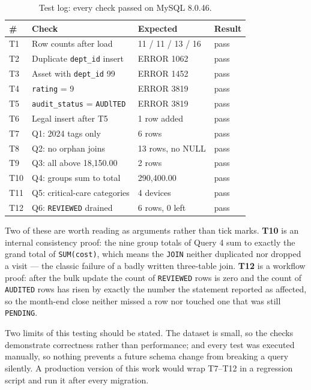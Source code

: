 \documentclass[conference]{IEEEtran}
\begin{document}
\begin{table}[!t]
\caption{Test log: every check passed on MySQL 8.0.46.}
\label{tab:tests}
\footnotesize
\begin{tabular}{p{0.3cm}p{2.6cm}p{2.3cm}p{0.9cm}}
\toprule
\textbf{\#} & \textbf{Check} & \textbf{Expected} & \textbf{Result} \\
\midrule
T1 & Row counts after load & 11 / 11 / 13 / 16 & pass \\
T2 & Duplicate \texttt{dept\_id} insert & ERROR 1062 & pass \\
T3 & Asset with \texttt{dept\_id} 99 & ERROR 1452 & pass \\
T4 & \texttt{rating} = 9 & ERROR 3819 & pass \\
T5 & \texttt{audit\_status} = \texttt{AUDlTED} & ERROR 3819 & pass \\
T6 & Legal insert after T5 & 1 row added & pass \\
T7 & Q1: 2024 tags only & 6 rows & pass \\
T8 & Q2: no orphan joins & 13 rows, no NULL & pass \\
T9 & Q3: all above 18,150.00 & 2 rows & pass \\
T10 & Q4: groups sum to total & 290,400.00 & pass \\
T11 & Q5: critical-care categories & 4 devices & pass \\
T12 & Q6: \texttt{REVIEWED} drained & 6 rows, 0 left & pass \\
\bottomrule
\end{tabular}
\end{table}

Two of these are worth reading as arguments rather than tick marks.
\textbf{T10} is an internal consistency proof: the nine group totals of Query 4
sum to exactly the grand total of \texttt{SUM(cost)}, which means the
\texttt{JOIN} neither duplicated nor dropped a visit --- the classic failure of
a badly written three-table join. \textbf{T12} is a workflow proof: after the
bulk update the count of \texttt{REVIEWED} rows is zero and the count of
\texttt{AUDITED} rows has risen by exactly the number the statement reported
as affected, so the month-end close neither missed a row nor touched one that
was still \texttt{PENDING}.

Two limits of this testing should be stated. The dataset is small, so the
checks demonstrate correctness rather than performance; and every test was
executed manually, so nothing prevents a future schema change from breaking a
query silently. A production version of this work would wrap T7--T12 in a
regression script and run it after every migration.
\end{document}

